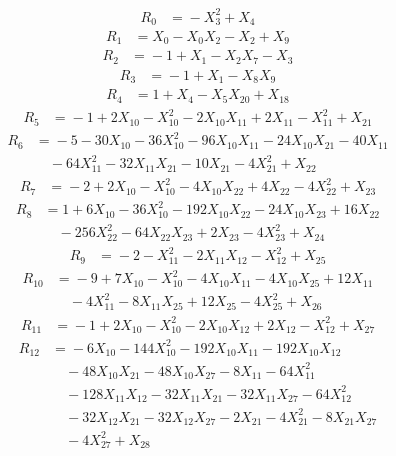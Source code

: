 \begingroup
\small
\setlength{\jot}{2pt}
\setlength{\abovedisplayskip}{5pt}
\setlength{\belowdisplayskip}{5pt}
\[\begin{aligned}
R_{0} &={}-X_{3}^{2} + X_{4}
\end{aligned}\]
\[\begin{aligned}
R_{1} &={}X_{0} - X_{0}X_{2} - X_{2} + X_{9}
\end{aligned}\]
\[\begin{aligned}
R_{2} &={}-1 + X_{1} - X_{2}X_{7} - X_{3}
\end{aligned}\]
\[\begin{aligned}
R_{3} &={}-1 + X_{1} - X_{8}X_{9}
\end{aligned}\]
\[\begin{aligned}
R_{4} &={}1 + X_{4} - X_{5}X_{20} + X_{18}
\end{aligned}\]
\[\begin{aligned}
R_{5} &={}-1 + 2X_{10} - X_{10}^{2} - 2X_{10}X_{11} + 2X_{11} - X_{11}^{2} + X_{21}
\end{aligned}\]
\[\begin{aligned}
R_{6} &={}-5 - 30X_{10} - 36X_{10}^{2} - 96X_{10}X_{11} - 24X_{10}X_{21} - 40X_{11}\\
&\quad{} - 64X_{11}^{2} - 32X_{11}X_{21} - 10X_{21} - 4X_{21}^{2} + X_{22}
\end{aligned}\]
\[\begin{aligned}
R_{7} &={}-2 + 2X_{10} - X_{10}^{2} - 4X_{10}X_{22} + 4X_{22} - 4X_{22}^{2} + X_{23}
\end{aligned}\]
\[\begin{aligned}
R_{8} &={}1 + 6X_{10} - 36X_{10}^{2} - 192X_{10}X_{22} - 24X_{10}X_{23} + 16X_{22}\\
&\quad{} - 256X_{22}^{2} - 64X_{22}X_{23} + 2X_{23} - 4X_{23}^{2} + X_{24}
\end{aligned}\]
\[\begin{aligned}
R_{9} &={}-2 - X_{11}^{2} - 2X_{11}X_{12} - X_{12}^{2} + X_{25}
\end{aligned}\]
\[\begin{aligned}
R_{10} &={}-9 + 7X_{10} - X_{10}^{2} - 4X_{10}X_{11} - 4X_{10}X_{25} + 12X_{11}\\
&\quad{} - 4X_{11}^{2} - 8X_{11}X_{25} + 12X_{25} - 4X_{25}^{2} + X_{26}
\end{aligned}\]
\[\begin{aligned}
R_{11} &={}-1 + 2X_{10} - X_{10}^{2} - 2X_{10}X_{12} + 2X_{12} - X_{12}^{2} + X_{27}
\end{aligned}\]
\[\begin{aligned}
R_{12} &={}-6X_{10} - 144X_{10}^{2} - 192X_{10}X_{11} - 192X_{10}X_{12}\\
&\quad{} - 48X_{10}X_{21} - 48X_{10}X_{27} - 8X_{11} - 64X_{11}^{2}\\
&\quad{} - 128X_{11}X_{12} - 32X_{11}X_{21} - 32X_{11}X_{27} - 64X_{12}^{2}\\
&\quad{} - 32X_{12}X_{21} - 32X_{12}X_{27} - 2X_{21} - 4X_{21}^{2} - 8X_{21}X_{27}\\
&\quad{} - 4X_{27}^{2} + X_{28}
\end{aligned}\]
